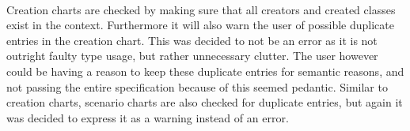 \paragraph{}
Creation charts are checked by making sure that all creators and created classes exist in the context. Furthermore it will also warn the user of possible duplicate entries in the creation chart. This was decided to not be an error as it is not outright faulty type usage, but rather unnecessary clutter. The user however could be having a reason to keep these duplicate entries for semantic reasons, and not passing the entire specification because of this seemed pedantic. Similar to creation charts, scenario charts are also checked for duplicate entries, but again it was decided to express it as a warning instead of an error. 